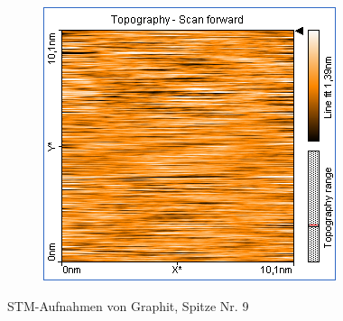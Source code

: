\begin{figure}
\begin{subfigure}[b]{\picwidth}
        \caption{}
        \label{fig:graphit_04_02}
    \end{subfigure}
    \begin{subfigure}[b]{\picwidth}
        \includegraphics[width=\textwidth]{data/Graphit/pic_04_03_10nm}
        \caption{}
        \label{fig:graphit_04_03}
    \end{subfigure}
    \caption{STM-Aufnahmen von Graphit, Spitze Nr. 9}\label{fig:graphit_04}
\end{figure}

